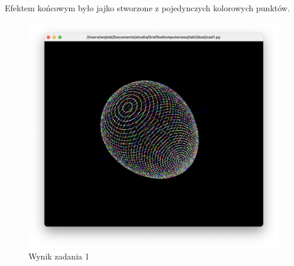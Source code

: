 \documentclass[]{article}
\begin{document}
Efektem końcowym było jajko stworzone z pojedynczych kolorowych punktów. 
\begin{figure}[H]

	\centering
	\includegraphics[width=\textwidth]{zad1.png}
	\caption{Wynik zadania 1}
\end{figure}
\end{document}
